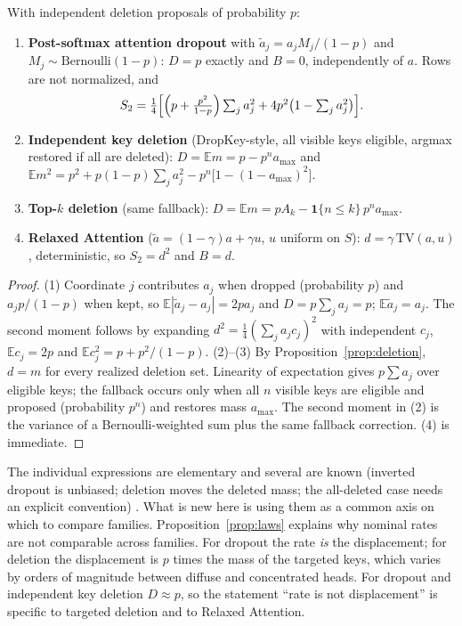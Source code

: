 \begin{proposition}\label{prop:laws}
With independent deletion proposals of probability $p$:
\begin{enumerate}
\item \textbf{Post-softmax attention dropout} with $\tilde a_j=a_jM_j/(1-p)$ and $M_j\sim\mathrm{Bernoulli}(1-p)$:
$D=p$ exactly and $B=0$, independently of $a$. Rows are not normalized, and
\[
S_2=\tfrac14\Bigl[\Bigl(p+\tfrac{p^2}{1-p}\Bigr)\textstyle\sum_ja_j^2+4p^2\bigl(1-\sum_ja_j^2\bigr)\Bigr].
\]
\item \textbf{Independent key deletion} (DropKey-style, all visible keys eligible, argmax restored if all
are deleted): $D=\mathbb E m=p-p^{n}a_{\max}$ and
$\mathbb E m^2=p^2+p(1-p)\sum_ja_j^2-p^{n}\bigl[1-(1-a_{\max})^2\bigr]$.
\item \textbf{Top-$k$ deletion} (same fallback): $D=\mathbb E m=pA_k-\mathbf 1\{n\le k\}\,p^{n}a_{\max}$.
\item \textbf{Relaxed Attention} ($\tilde a=(1-\gamma)a+\gamma u$, $u$ uniform on $S$): $d=\gamma\,\mathrm{TV}(a,u)$,
deterministic, so $S_2=d^2$ and $B=d$.
\end{enumerate}
\end{proposition}
\begin{proof}
(1) Coordinate $j$ contributes $a_j$ when dropped (probability $p$) and $a_jp/(1-p)$ when kept, so
$\mathbb E|\tilde a_j-a_j|=2pa_j$ and $D=p\sum_ja_j=p$; $\mathbb E\tilde a_j=a_j$. The second moment
follows by expanding $d^2=\tfrac14(\sum_ja_jc_j)^2$ with independent $c_j$, $\mathbb Ec_j=2p$ and
$\mathbb Ec_j^2=p+p^2/(1-p)$.
(2)--(3) By Proposition~\ref{prop:deletion}, $d=m$ for every realized deletion set. Linearity of
expectation gives $p\sum a_j$ over eligible keys; the fallback occurs only when all $n$ visible keys
are eligible and proposed (probability $p^n$) and restores mass $a_{\max}$. The second moment in (2)
is the variance of a Bernoulli-weighted sum plus the same fallback correction.
(4) is immediate.
\end{proof}

The individual expressions are elementary and several are known (inverted dropout is unbiased; deletion
moves the deleted mass; the all-deleted case needs an explicit convention)
\citep{srivastava2014dropout,li2023dropkey,wu2021notall,wang2024loradropout}. What is new here is using them
as a common axis on which to compare families. Proposition~\ref{prop:laws} explains why nominal rates are not comparable across families. For
dropout the rate \emph{is} the displacement; for deletion the displacement is $p$ times the mass of
the targeted keys, which varies by orders of magnitude between diffuse and concentrated heads. For
dropout and independent key deletion $D\approx p$, so the statement ``rate is not displacement'' is
specific to targeted deletion and to Relaxed Attention.

